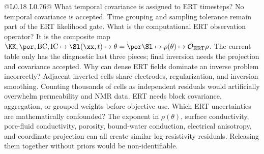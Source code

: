 \begin{longtable}{@{}L{0.18\textwidth} L{0.76\textwidth}@{}}
{ What temporal covariance is assigned to ERT timesteps?}
{No temporal covariance is accepted.  Time grouping and sampling tolerance remain
part of the ERT likelihood gate.}
{ What is the computational ERT observation operator?}
{It is the composite map
\(\KK,\por,\mathrm{BC},\mathrm{IC}\mapsto \Sl(\xx,t)\mapsto
\theta=\por\Sl\mapsto\rho(\theta)\mapsto\mathcal O_{\mathrm{ERT}}\rho\).  The
current table only has the diagnostic last three pieces; final inversion needs the
projection and covariance accepted.}
{ Why can dense ERT fields dominate an inverse problem incorrectly?}
{Adjacent inverted cells share electrodes, regularization, and inversion smoothing.
Counting thousands of cells as independent residuals would artificially overwhelm
permeability and NMR data.  ERT needs block covariance, aggregation, or grouped
weights before objective use.}
{ Which ERT uncertainties are mathematically confounded?}
{The exponent in \(\rho(\theta)\), surface conductivity, pore-fluid conductivity,
porosity, bound-water conduction, electrical anisotropy, and coordinate projection
can all create similar log-resistivity residuals.  Releasing them together without
priors would be non-identifiable.}
\bottomrule
\end{longtable}

